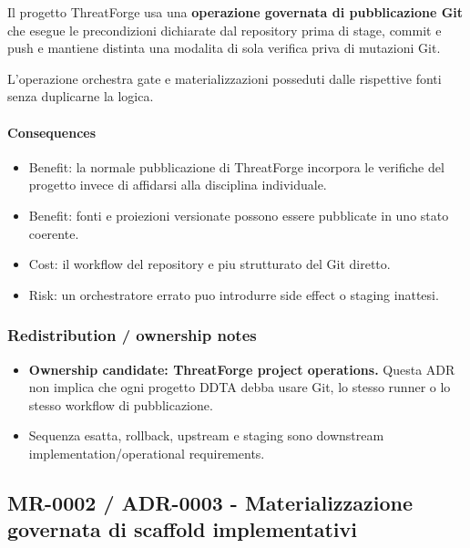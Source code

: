 \documentclass[
  10pt,
]{article}
\providecommand{\tightlist}{%
  \setlength{\itemsep}{0pt}\setlength{\parskip}{0pt}}
\begin{document}
Il progetto ThreatForge usa una \textbf{operazione governata di
pubblicazione Git} che esegue le precondizioni dichiarate dal repository
prima di stage, commit e push e mantiene distinta una modalita di sola
verifica priva di mutazioni Git.

L'operazione orchestra gate e materializzazioni posseduti dalle
rispettive fonti senza duplicarne la logica.

\paragraph{Consequences}\label{consequences-21}

\begin{itemize}
\tightlist
\item
  Benefit: la normale pubblicazione di ThreatForge incorpora le
  verifiche del progetto invece di affidarsi alla disciplina
  individuale.
\item
  Benefit: fonti e proiezioni versionate possono essere pubblicate in
  uno stato coerente.
\item
  Cost: il workflow del repository e piu strutturato del Git diretto.
\item
  Risk: un orchestratore errato puo introdurre side effect o staging
  inattesi.
\end{itemize}

\subsubsection{Redistribution / ownership
notes}\label{redistribution-ownership-notes-10}

\begin{itemize}
\tightlist
\item
  \textbf{Ownership candidate: ThreatForge project operations.} Questa
  ADR non implica che ogni progetto DDTA debba usare Git, lo stesso
  runner o lo stesso workflow di pubblicazione.
\item
  Sequenza esatta, rollback, upstream e staging sono downstream
  implementation/operational requirements.
\end{itemize}

\subsection{MR-0002 / ADR-0003 - Materializzazione governata di scaffold
implementativi}\label{mr-0002-adr-0003---materializzazione-governata-di-scaffold-implementativi}
\end{document}
